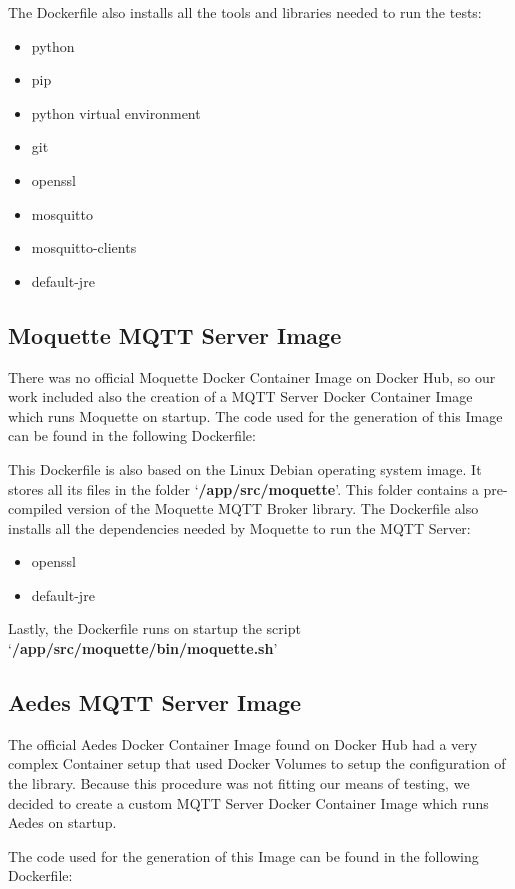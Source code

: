 \documentclass[binding=0.6cm,noexaminfo]{sapthesis}
\begin{document}
The Dockerfile also installs all the tools and libraries needed to run the tests:
\begin{itemize}
	\item python
	\item pip
	\item python virtual environment
	\item git
	\item openssl
	\item mosquitto
	\item mosquitto-clients
	\item default-jre
\end{itemize}
\subsection{Moquette MQTT Server Image}
There was no official Moquette Docker Container Image on Docker Hub, so our work included also the creation of a MQTT Server Docker Container Image which runs Moquette on startup.
The code used for the generation of this Image can be found in the following Dockerfile:


This Dockerfile is also based on the Linux Debian operating system image. It stores all its files in the folder `\textbf{/app/src/moquette}'. This folder contains a pre-compiled version of the Moquette MQTT Broker library.
The Dockerfile also installs all the dependencies needed by Moquette to run the MQTT Server:
\begin{itemize}
	\item openssl
	\item default-jre
\end{itemize}
Lastly, the Dockerfile runs on startup the script `\textbf{/app/src/moquette/bin/moquette.sh}'
\subsection{Aedes MQTT Server Image}
The official Aedes Docker Container Image found on Docker Hub had a very complex Container setup that used Docker Volumes to setup the configuration of the library. Because this procedure was not fitting our means of testing, we decided to create a custom MQTT Server Docker Container Image which runs Aedes on startup.

The code used for the generation of this Image can be found in the following Dockerfile:

\end{document}
